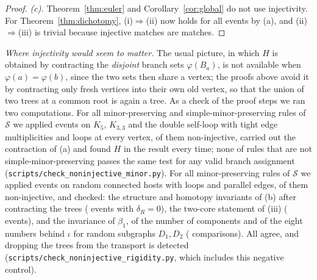 \documentclass[10pt]{article}
\theoremstyle{definition}
\theoremstyle{plain}
\theoremstyle{remark}
\newcommand{\Betti}{\beta_1}
\begin{document}
\begin{proof}
\emph{(c).} Theorem~\ref{thm:euler} and Corollary~\ref{cor:global} do not use injectivity. For Theorem~\ref{thm:dichotomy}, (i)$\Rightarrow$(ii) now holds for all events by (a), and (ii)$\Rightarrow$(iii) is trivial because injective matches are matches.
\end{proof}
\noindent\emph{Where injectivity would seem to matter.} The usual picture, in which $H$ is obtained by contracting the \emph{disjoint} branch sets $\varphi(B_a)$, is not available when $\varphi(a)=\varphi(b)$, since the two sets then share a vertex; the proofs above avoid it by contracting only fresh vertices into their own old vertex, so that the union of two trees at a common root is again a tree. As a check of the proof steps we ran two computations. For all minor-preserving and simple-minor-preserving rules of $\mathcal S$ we applied \nimEvents{} events on $K_5$, $K_{3,3}$ and the double self-loop with tight edge multiplicities and loops at every vertex, \nimNonInj{} of them non-injective, carried out the contraction of (a) and found $H$ in the result every time; none of \nimCtrl{} rules that are not simple-minor-preserving passes the same test for any valid branch assignment (\texttt{scripts/check\_noninjective\_minor.py}). For all \nrRules{} minor-preserving rules of $\mathcal S$ we applied \nrEvents{} events on random connected hosts with loops and parallel edges, \nrNonInj{} of them non-injective, and checked: the structure and homotopy invariants of (b) after contracting the trees (\nrRigid{} events with $\delta_R=0$), the two-core statement of (iii) (\nrTwoCore{} events), and the invariance of $\Betti$, of the number of components and of the eight numbers behind $\iota$ for random subgraphs $D_1,D_2$ (\nrTransport{} comparisons). All agree, and dropping the trees from the transport is detected (\texttt{scripts/check\_noninjective\_rigidity.py}, which includes this negative control).

\end{document}
